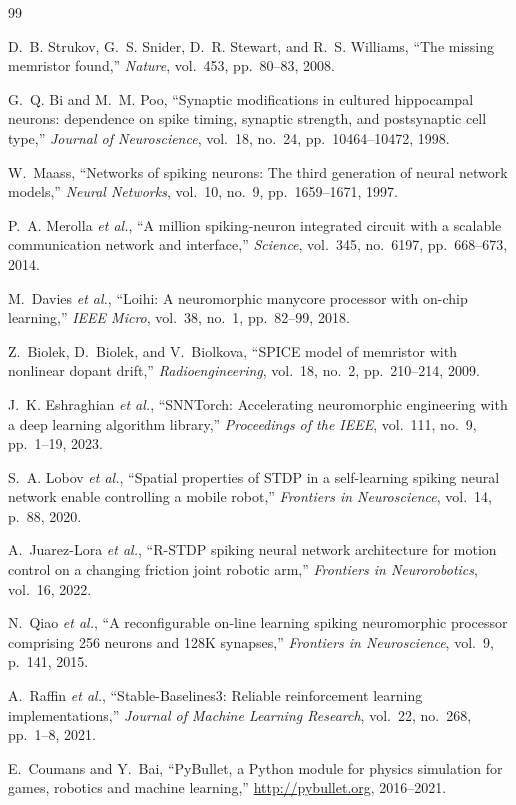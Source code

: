 \documentclass[11pt,a4paper]{article}
\begin{document}
\begin{thebibliography}{99}
\small

D.~B. Strukov, G.~S. Snider, D.~R. Stewart, and R.~S. Williams,
``The missing memristor found,''
\textit{Nature}, vol.~453, pp.~80--83, 2008.

G.~Q. Bi and M.~M. Poo,
``Synaptic modifications in cultured hippocampal neurons: dependence on spike timing,
synaptic strength, and postsynaptic cell type,''
\textit{Journal of Neuroscience}, vol.~18, no.~24, pp.~10464--10472, 1998.

W.~Maass,
``Networks of spiking neurons: The third generation of neural network models,''
\textit{Neural Networks}, vol.~10, no.~9, pp.~1659--1671, 1997.

P.~A. Merolla \textit{et al.},
``A million spiking-neuron integrated circuit with a scalable communication network
and interface,''
\textit{Science}, vol.~345, no.~6197, pp.~668--673, 2014.

M.~Davies \textit{et al.},
``Loihi: A neuromorphic manycore processor with on-chip learning,''
\textit{IEEE Micro}, vol.~38, no.~1, pp.~82--99, 2018.

Z.~Biolek, D.~Biolek, and V.~Biolkova,
``SPICE model of memristor with nonlinear dopant drift,''
\textit{Radioengineering}, vol.~18, no.~2, pp.~210--214, 2009.

J.~K. Eshraghian \textit{et al.},
``SNNTorch: Accelerating neuromorphic engineering with a deep learning algorithm
library,''
\textit{Proceedings of the IEEE}, vol.~111, no.~9, pp.~1--19, 2023.

S.~A. Lobov \textit{et al.},
``Spatial properties of STDP in a self-learning spiking neural network enable
controlling a mobile robot,''
\textit{Frontiers in Neuroscience}, vol.~14, p.~88, 2020.

A.~Juarez-Lora \textit{et al.},
``R-STDP spiking neural network architecture for motion control on a changing friction
joint robotic arm,''
\textit{Frontiers in Neurorobotics}, vol.~16, 2022.

N.~Qiao \textit{et al.},
``A reconfigurable on-line learning spiking neuromorphic processor comprising 256
neurons and 128K synapses,''
\textit{Frontiers in Neuroscience}, vol.~9, p.~141, 2015.

A.~Raffin \textit{et al.},
``Stable-Baselines3: Reliable reinforcement learning implementations,''
\textit{Journal of Machine Learning Research}, vol.~22, no.~268, pp.~1--8, 2021.

E.~Coumans and Y.~Bai,
``PyBullet, a Python module for physics simulation for games, robotics and machine
learning,'' \url{http://pybullet.org}, 2016--2021.

\end{thebibliography}
\end{document}

